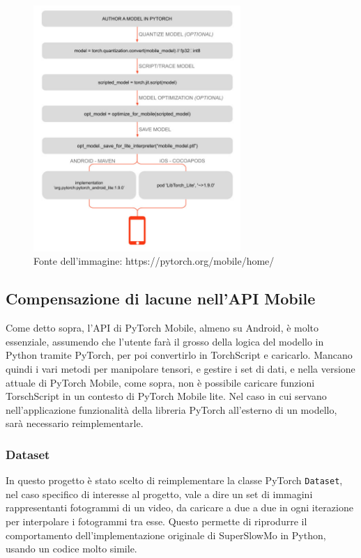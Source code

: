 \begin{figure}[!bh]
    \centering
    \includegraphics[width=0.7\textwidth]{img/pytorch_mobile_workflow.jpg}
    \caption{Fonte dell'immagine: https://pytorch.org/mobile/home/ \cite{sito_pytorch_mobile}}
    \label{fig:workflow_pytorch_mobile}
\end{figure}

\FloatBarrier

\subsection{Compensazione di lacune nell'API Mobile}

Come detto sopra, l'API di PyTorch Mobile, almeno su Android, è molto essenziale, assumendo
che l'utente farà il grosso della logica del modello in Python tramite PyTorch, per poi
convertirlo in TorchScript e caricarlo. Mancano quindi i vari metodi per manipolare tensori,
e gestire i set di dati, e nella versione attuale di PyTorch Mobile, come sopra, non è possibile
caricare funzioni TorschScript in un contesto di PyTorch Mobile lite. Nel caso in cui servano 
nell'applicazione funzionalità della libreria PyTorch all'esterno di un modello, sarà necessario
reimplementarle.

\subsubsection*{Dataset}
\label{sec:dataset}

In questo progetto è stato scelto di reimplementare la classe PyTorch \texttt{Dataset}, 
nel caso specifico di interesse al progetto, vale a dire un set di immagini rappresentanti
fotogrammi di un video, da caricare a due a due in ogni iterazione per interpolare i fotogrammi
tra esse. Questo permette di riprodurre il comportamento dell'implementazione originale di
SuperSlowMo in Python, usando un codice molto simile.

